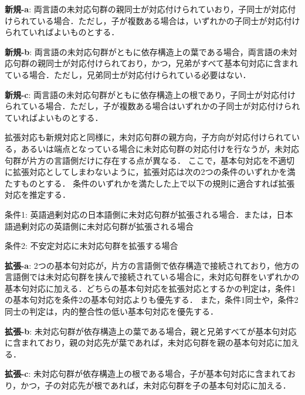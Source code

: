 \vspace{1ex}
\begin{description}
\item {\bf 新規-a}: 両言語の未対応句群の親同士が対応付けられていおり，子同士が対応付けられている場合．ただし，子が複数ある場合は，いずれかの子同士が対応付けられていればよいものとする．
\item {\bf 新規-b}: 両言語の未対応句群がともに依存構造上の葉である場合，両言語の未対応句群の親同士が対応付けられており，かつ，兄弟がすべて基本句対応に含まれている場合．ただし，兄弟同士が対応付けられている必要はない．
\item {\bf 新規-c}: 両言語の未対応句群がともに依存構造上の根であり，子同士が対応付けられている場合．ただし，子が複数ある場合はいずれかの子同士が対応付けられていればよいものとする．
\end{description}
\vspace{1ex}


\vspace{1ex}

拡張対応も新規対応と同様に，未対応句群の親方向，子方向が対応付けられている，あるいは端点となっている場合に未対応句群の対応付けを行なうが，未対応句群が片方の言語側だけに存在する点が異なる．
ここで，基本句対応を不適切に拡張対応としてしまわないように，拡張対応は次の2つの条件のいずれかを満たすものとする．
条件のいずれかを満たした上で以下の規則に適合すれば拡張対応を推定する．



\vspace{1ex}
\begin{description}
\item 条件1: 英語過剰対応の日本語側に未対応句群が拡張される場合．または，日本語過剰対応の英語側に未対応句群が拡張される場合
\item 条件2: 不安定対応に未対応句群を拡張する場合
\end{description}
\vspace{1ex}

\vspace{1ex}

\vspace{1ex}
\begin{description}
\item {\bf 拡張-a}: 2つの基本句対応が，片方の言語側で依存構造で接続されており，他方の言語側では未対応句群を挟んで接続されている場合に，未対応句群をいずれかの基本句対応に加える．どちらの基本句対応を拡張対応とするかの判定は，条件1の基本句対応を条件2の基本句対応よりも優先する．
また，条件1同士や，条件2同士の判定は，内的整合性の低い基本句対応を優先する．
\item {\bf 拡張-b}: 未対応句群が依存構造上の葉である場合，親と兄弟すべてが基本句対応に含まれており，親の対応先が葉であれば，未対応句群を親の基本句対応に加える．
\item {\bf 拡張-c}: 未対応句群が依存構造上の根である場合，子が基本句対応に含まれており，かつ，子の対応先が根であれば，未対応句群を子の基本句対応に加える．
\end{description}
\vspace{1ex}



